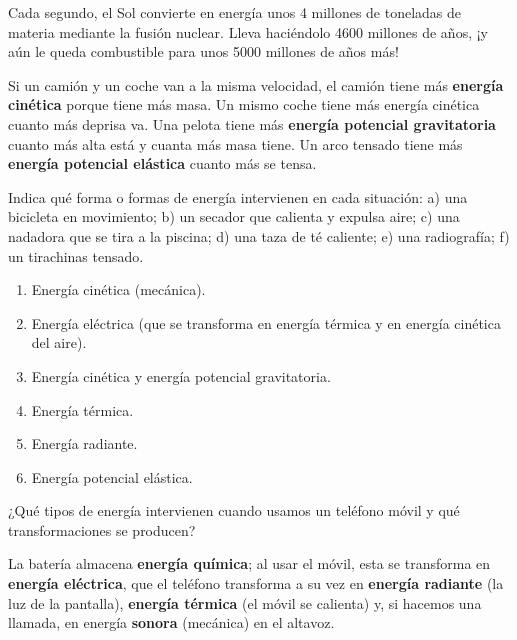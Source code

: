 \begin{didyouknow}
    Cada segundo, el Sol convierte en energía unos 4 millones de toneladas de materia mediante la fusión nuclear. Lleva haciéndolo \num{4600} millones de años, ¡y aún le queda combustible para unos \num{5000} millones de años más!
\end{didyouknow}

\begin{example}
    Si un camión y un coche van a la misma velocidad, el camión tiene más \textbf{energía cinética} porque tiene más masa. Un mismo coche tiene más energía cinética cuanto más deprisa va. Una pelota tiene más \textbf{energía potencial gravitatoria} cuanto más alta está y cuanta más masa tiene. Un arco tensado tiene más \textbf{energía potencial elástica} cuanto más se tensa.
\end{example}

\begin{exercise}
    Indica qué forma o formas de energía intervienen en cada situación: a) una bicicleta en movimiento; b) un secador que calienta y expulsa aire; c) una nadadora que se tira a la piscina; d) una taza de té caliente; e) una radiografía; f) un tirachinas tensado.
    \begin{solu}
        \begin{enumerate}[label=\alph*)]
            \item Energía cinética (mecánica).
            \item Energía eléctrica (que se transforma en energía térmica y en energía cinética del aire).
            \item Energía cinética y energía potencial gravitatoria.
            \item Energía térmica.
            \item Energía radiante.
            \item Energía potencial elástica.
        \end{enumerate}
    \end{solu}
\end{exercise}

\begin{exercise}
    ¿Qué tipos de energía intervienen cuando usamos un teléfono móvil y qué transformaciones se producen?
    \begin{solu}
        La batería almacena \textbf{energía química}; al usar el móvil, esta se transforma en \textbf{energía eléctrica}, que el teléfono transforma a su vez en \textbf{energía radiante} (la luz de la pantalla), \textbf{energía térmica} (el móvil se calienta) y, si hacemos una llamada, en energía \textbf{sonora} (mecánica) en el altavoz.
    \end{solu}
\end{exercise}

